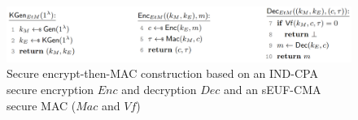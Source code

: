 \begin{figure}[H]
    \center
    \includegraphics[width=\linewidth]{gfx/EncryptThenMAC.png}
    \caption{Secure encrypt-then-MAC construction based on an IND-CPA secure encryption $Enc$ and decryption $Dec$ and an sEUF-CMA secure MAC ($Mac$ and $Vf$)}
    \label{fig:encrypt_then_mac}
\end{figure}



